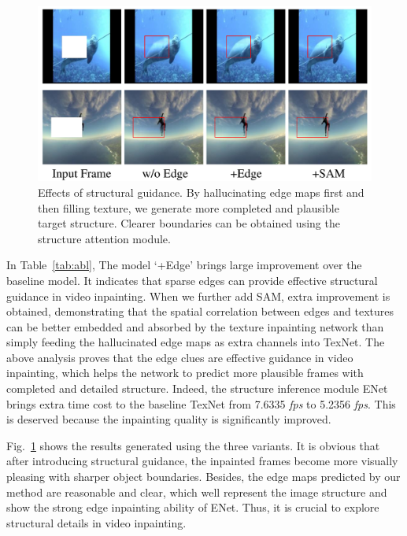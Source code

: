 \begin{figure}[t]
	\centering
	\includegraphics[width=0.97\columnwidth]{edgevis} %
	\caption{Effects of structural guidance. By hallucinating edge maps first and then filling texture, we generate more completed and plausible target structure. Clearer boundaries can be obtained using the structure attention module.}
	\label{edgevis}
\end{figure}



In Table~\ref{tab:abl}, The model `+Edge' brings large improvement over the baseline model.
It indicates that sparse edges can provide effective structural guidance in video inpainting.
When we further add SAM, extra improvement is obtained, demonstrating that the spatial correlation between edges and textures can be better embedded and absorbed by the texture inpainting network than simply feeding the hallucinated edge maps as extra channels into TexNet.
The above analysis proves that the edge clues are effective guidance in video inpainting, which helps the network to predict more plausible frames with completed and detailed structure.
Indeed, the structure inference module ENet brings extra time cost to the baseline TexNet from 7.6335 \emph{fps} to 5.2356 \emph{fps}.
This is deserved because the inpainting quality is significantly improved.

Fig.~\ref{edgevis} shows the results generated using the three variants. 
It is obvious that after introducing structural guidance, the inpainted frames become more visually pleasing with sharper object boundaries. 
Besides, the edge maps predicted by our method are reasonable and clear, which well represent the image structure and show the strong edge inpainting ability of ENet. 
Thus, it is crucial to explore structural details in video inpainting.
 



